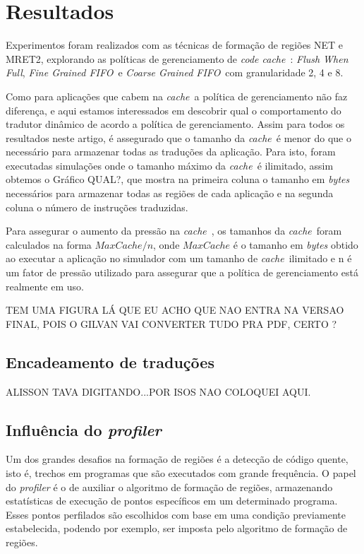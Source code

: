 \documentclass[11pt,twoside]{article}
\newcommand{\ccache}{\emph{code cache}}
\newcommand{\cache}{\emph{cache}}
\newcommand{\flush}{\emph{Flush When Full}}
\newcommand{\finefifo}{\emph{Fine Grained FIFO}}
\newcommand{\coarsefifo}{\emph{Coarse Grained FIFO}}
\begin{document}
\section{Resultados}
Experimentos foram realizados com as técnicas de formação de regiões NET e MRET2, explorando as políticas de gerenciamento de \ccache~: \flush, \finefifo~e \coarsefifo~com granularidade 2, 4 e 8. 

Como para aplicações que cabem na \cache~a política de gerenciamento não faz diferença, e aqui estamos interessados em descobrir qual o comportamento do tradutor dinâmico de acordo a política de gerenciamento. Assim para todos os resultados neste artigo, é assegurado que o tamanho da \cache~é menor do que o necessário para armazenar todas as traduções da aplicação. Para isto, foram executadas simulações onde o tamanho máximo da \cache~é ilimitado, assim obtemos o Gráfico {\large QUAL?}, que mostra na primeira coluna o tamanho em \emph{bytes} necessários para armazenar todas as regiões de cada aplicação e na segunda coluna o número de instruções traduzidas.

Para assegurar o aumento da pressão na \cache~, os tamanhos da \cache~foram calculados na forma $MaxCache/n$, onde $MaxCache$ é o tamanho em \emph{bytes} obtido ao executar a aplicação no simulador com um tamanho de \cache~ilimitado e n é um fator de pressão utilizado para assegurar que a política de gerenciamento está realmente em uso.

\begin{large}
TEM UMA FIGURA LÁ QUE EU ACHO QUE NAO ENTRA NA VERSAO FINAL, POIS O GILVAN VAI CONVERTER TUDO PRA PDF, CERTO ?
\end{large}


\subsection{Encadeamento de traduções}
\begin{large}
ALISSON TAVA DIGITANDO...POR ISOS NAO COLOQUEI AQUI.
\end{large}

\subsection{Influência do \emph{profiler}}
Um dos grandes desafios na formação de regiões é a detecção de código quente, isto é, trechos em programas que são executados com grande frequência. O papel do \emph{profiler} é o de auxiliar o algoritmo de formação de regiões, armazenando estatísticas de execução de pontos específicos em um determinado programa. Esses pontos perfilados são escolhidos com base em uma condição previamente estabelecida, podendo por exemplo, ser imposta pelo algoritmo de formação de regiões. 
\end{document}
